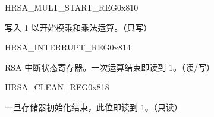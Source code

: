 \begin{register}{H}{RSA\_MULT\_START\_REG}{0x810}\label{regdesc:RSAMULTSTARTREG}
%
%
\regnewline%
\begin{regdesc}\begin{reglist}
\item [RSA\_MULT\_START] 写入 1 以开始模乘和乘法运算。（只写）
\end{reglist}\end{regdesc}
\end{register}


\begin{register}{H}{RSA\_INTERRUPT\_REG}{0x814}\label{regdesc:RSAINTERRUPTREG}
%
%
\regnewline%
\begin{regdesc}\begin{reglist}
\item [RSA\_INTERRUPT] RSA 中断状态寄存器。一次运算结束即读到 1。（读/写）
\end{reglist}\end{regdesc}
\end{register}


\begin{register}{H}{RSA\_CLEAN\_REG}{0x818}\label{regdesc:RSACLEANREG}
%
%
\regnewline%
\begin{regdesc}\begin{reglist}
\item [RSA\_CLEAN] 一旦存储器初始化结束，此位即读到 1。（只读）
\end{reglist}\end{regdesc}
\end{register}
